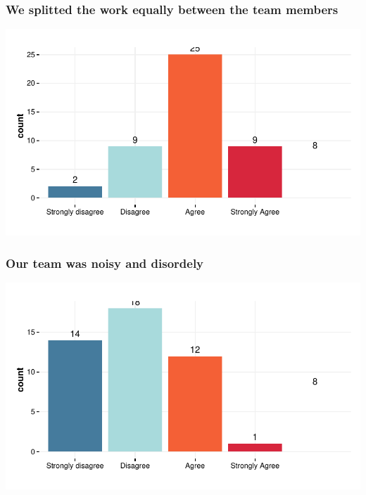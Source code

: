 \documentclass{article}
\begin{document}
\subsubsection{We splitted the work equally between the team members}
\includegraphics{Raw_num/plots/-plot_split_work}

\subsubsection{Our team was noisy and disordely}
\includegraphics{Raw_num/plots/-plot_unorganized_team}
\end{document}
